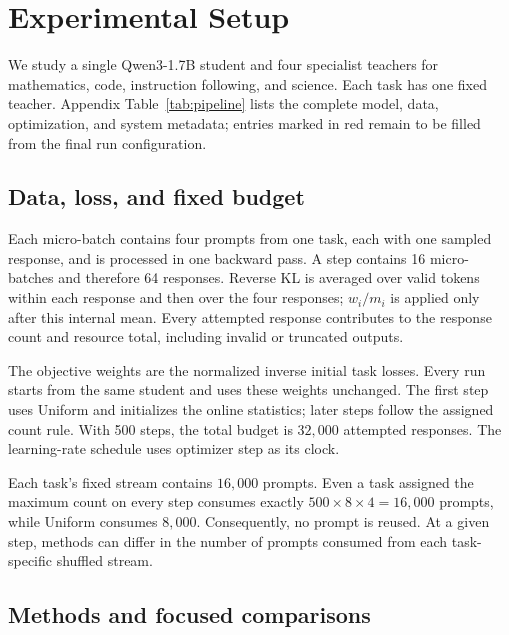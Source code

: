 \section{Experimental Setup}
\label{sec:experiments}

We study a single Qwen3-1.7B student and four specialist teachers for
mathematics, code, instruction following, and science. Each task has one fixed
teacher. Appendix Table~\ref{tab:pipeline} lists the complete model, data,
optimization, and system metadata; entries marked in red remain to be filled
from the final run configuration.

\subsection{Data, loss, and fixed budget}

Each micro-batch contains four prompts from one task, each with one sampled
response, and is processed in one backward pass. A step contains 16
micro-batches and therefore 64 responses. Reverse KL is averaged over valid
tokens within each response and then over the four responses; $w_i/m_i$ is
applied only after this internal mean. Every attempted response contributes to
the response count and resource total, including invalid or truncated outputs.

The objective weights are the normalized inverse initial task losses. Every run
starts from the same student and uses these weights unchanged. The first step
uses Uniform and initializes the online statistics; later steps follow the
assigned count rule. With 500 steps, the total budget is $32{,}000$ attempted
responses. The learning-rate schedule uses optimizer step as its clock.

Each task's fixed stream contains $16{,}000$ prompts. Even a task assigned the
maximum count on every step consumes exactly
$500\times8\times4=16{,}000$ prompts, while Uniform consumes $8{,}000$.
Consequently, no prompt is reused. At a given step, methods can differ in the
number of prompts consumed from each task-specific shuffled stream.

\subsection{Methods and focused comparisons}

